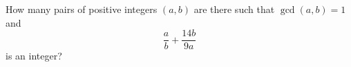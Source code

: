 How many pairs of positive integers $(a,b)$ are there such that $\gcd(a,b)=1$ and
\[
\dfrac{a}{b}+\dfrac{14b}{9a}
\]
is an integer?
